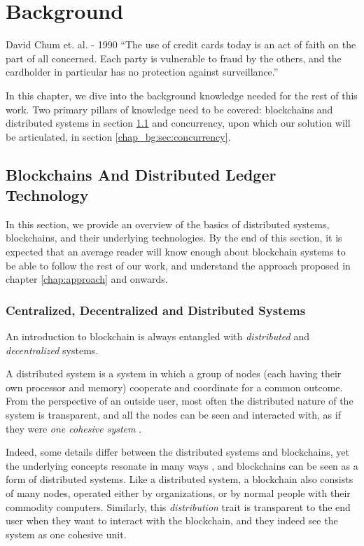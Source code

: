 \chapter{Background} \label{chap:background}

\begin{chapquote}{David Chum et. al. - 1990}
``The use of credit cards today is an act of faith on the part of all concerned. Each party is
vulnerable to fraud by the others, and the cardholder in particular has no protection against
surveillance.''
\end{chapquote}


In this chapter, we dive into the background knowledge needed for the rest of this work. Two primary
pillars of knowledge need to be covered: blockchains and distributed systems in section
\ref{chap_bg:sec:blockchains} and concurrency, upon which our solution will be articulated, in
section \ref{chap_bg:sec:concurrency}.

\section{Blockchains And Distributed Ledger Technology} \label{chap_bg:sec:blockchains}

In this section, we provide an overview of the basics of distributed systems, blockchains, and their
underlying technologies. By the end of this section, it is expected that an average reader will know
enough about blockchain systems to be able to follow the rest of our work, and understand the
approach proposed in chapter \ref{chap:approach} and onwards.

\subsection{Centralized, Decentralized and Distributed Systems} \label{chap_bg_:subsec:network}

An introduction to blockchain is always entangled with \textit{distributed} and
\textit{decentralized} systems.

A distributed system is a system in which a group of nodes (each having their own processor and
memory) cooperate and coordinate for a common outcome. From the perspective of an outside user, most
often the distributed nature of the system is transparent, and all the nodes can be seen and
interacted with, as if they were \textit{one cohesive system}
\cite{bashirMASTERINGBLOCKCHAINDistributed2018}.

Indeed, some details differ between the distributed systems and blockchains, yet the underlying
concepts resonate in many ways \cite{herlihyBlockchainsDistributedComputing2019}, and blockchains
can be seen as a form of distributed systems. Like a distributed system, a blockchain also consists
of many nodes, operated either by organizations, or by normal people with their commodity computers.
Similarly, this \textit{distribution} trait is transparent to the end user when they want to
interact with the blockchain, and they indeed see the system as one cohesive unit.

